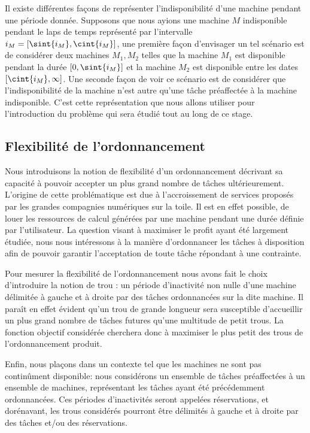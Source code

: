 \documentclass[a4paper,11pt]{report}
\begin{document}
Il existe différentes façons de représenter l'indisponibilité d'une machine pendant une période
donnée. Supposons que nous ayions une machine $M$ indisponible pendant le laps de temps représenté par
l'intervalle $i_M = \left[ \sint{i_M}, \cint{i_M} \right]$, une première façon d'envisager un tel
scénario est de considérer deux machines $M_1, M_2$ telles que la machine $M_1$ est disponible
pendant la durée $\left[ 0, \sint{i_M} \right]$ et la machine $M_2$ est disponible entre les dates
$\left[ \cint{i_M}, \infty \right]$. Une seconde façon de voir ce scénario est de considérer que
l'indisponibilité de la machine n'est autre qu'une tâche préaffectée à la machine indisponible. C'est
cette représentation que nous allons utiliser pour l'introduction du problème \fisched{} qui sera
étudié tout au long de ce stage.

\subsection{Flexibilité de l'ordonnancement}

Nous introduisons la notion de flexibilité d'un ordonnancement décrivant
sa capacité à pouvoir accepter un plus grand nombre de tâches ultérieurement. L'origine de cette
problématique est due à l'accroissement de services proposés par les grandes compagnies numériques
sur la toile. Il est en effet possible, de louer les ressources de calcul générées par une machine
pendant une durée définie par l'utilisateur. La question visant à maximiser le profit ayant été
largement étudiée, nous nous intéressons à la manière d'ordonnancer les tâches à disposition afin de
pouvoir garantir l'acceptation de toute tâche répondant à une contrainte. 

Pour mesurer la flexibilité de l'ordonnancement nous avons fait le choix d'introduire la notion de
trou : un période d'inactivité non nulle d'une machine délimitée à gauche et à droite par des tâches
ordonnancées sur la dite machine. Il paraît en effet évident qu'un trou de grande longueur sera
susceptible d'accueillir un plus grand nombre de tâches futures qu'une multitude de petit trous.
La fonction objectif considérée cherchera donc à maximiser le plus petit des trous de
l'ordonnancement produit.

Enfin, nous plaçons dans un contexte tel que les machines ne sont pas continûment disponible: nous
considérons un ensemble de tâches préaffectées à un ensemble de machines, représentant les tâches
ayant été précédemment ordonnancées. Ces périodes d'inactivités
seront appelées réservations, et dorénavant, les trous considérés pourront être délimités à gauche
et à droite par des tâches et/ou des réservations.
\end{document}
